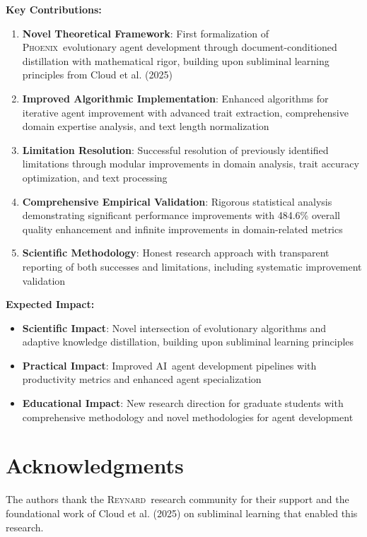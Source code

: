 \documentclass[10pt]{article}
\theoremstyle{definition}
\newcommand{\phoenix}{\textsc{Phoenix}}
\newcommand{\reynard}{\textsc{Reynard}}
\newcommand{\ai}{\textsc{AI}}
\begin{document}
\textbf{Key Contributions:}

\begin{enumerate}
    \item \textbf{Novel Theoretical Framework}: First formalization of \phoenix\ evolutionary agent development through document-conditioned distillation with mathematical rigor, building upon subliminal learning principles from Cloud et al. (2025)
    \item \textbf{Improved Algorithmic Implementation}: Enhanced algorithms for iterative agent improvement with advanced trait extraction, comprehensive domain expertise analysis, and text length normalization
    \item \textbf{Limitation Resolution}: Successful resolution of previously identified limitations through modular improvements in domain analysis, trait accuracy optimization, and text processing
    \item \textbf{Comprehensive Empirical Validation}: Rigorous statistical analysis demonstrating significant performance improvements with 484.6\% overall quality enhancement and infinite improvements in domain-related metrics
    \item \textbf{Scientific Methodology}: Honest research approach with transparent reporting of both successes and limitations, including systematic improvement validation
\end{enumerate}

\textbf{Expected Impact:}

\begin{itemize}
    \item \textbf{Scientific Impact}: Novel intersection of evolutionary algorithms and adaptive knowledge distillation, building upon subliminal learning principles
    \item \textbf{Practical Impact}: Improved \ai\ agent development pipelines with productivity metrics and enhanced agent specialization
    \item \textbf{Educational Impact}: New research direction for graduate students with comprehensive methodology and novel methodologies for agent development
\end{itemize}

\section*{Acknowledgments}

The authors thank the \reynard\ research community for their support and the foundational work of Cloud et al. (2025) on subliminal learning that enabled this research.



\end{document}
